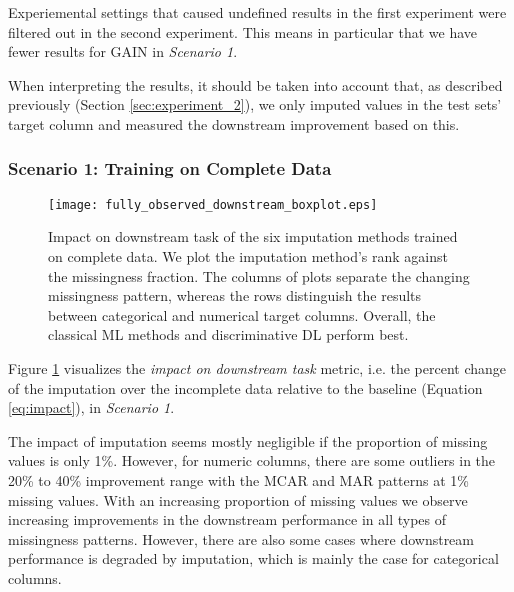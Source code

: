 Experiemental settings that caused undefined results in the first experiment were filtered out in the second experiment. This means in particular that we have fewer results for GAIN in \textit{Scenario 1}.

When interpreting the results, it should be taken into account that, as described previously (Section \ref{sec:experiment_2}), we only imputed values in the test sets’ target column and measured the downstream improvement based on this.


\subsubsection{Scenario 1: Training on Complete Data}


\begin{figure}\centering
	\texttt{[image: fully\_observed\_downstream\_boxplot.eps]}

	\caption[Downstream Ranks - Fully Observed]{Impact on downstream task of the six imputation methods trained on complete data. We plot the imputation method's rank against the missingness fraction. The columns of plots separate the changing missingness pattern, whereas the rows distinguish the results between categorical and numerical target columns. Overall, the classical ML methods and discriminative DL perform best.
    }
	\label{fig:fully_observed_downstream_boxplot}
\end{figure}

Figure \ref{fig:fully_observed_downstream_boxplot} visualizes the \textit{impact on downstream task} metric, i.e. the percent change of the imputation over the incomplete data relative to the baseline (Equation \ref{eq:impact}), in \textit{Scenario 1}.

The impact of imputation seems mostly negligible if the proportion of missing values is only 1\%. However, for numeric columns, there are some outliers in the 20\% to 40\% improvement range with the MCAR and MAR patterns at 1\% missing values. With an increasing proportion of missing values we observe increasing improvements in the downstream performance in all types of missingness patterns. However, there are also some cases where downstream performance is degraded by imputation, which is mainly the case for categorical columns.

